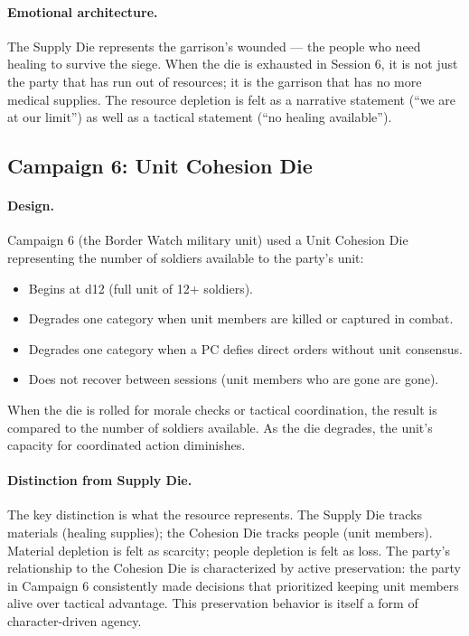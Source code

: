 \paragraph{Emotional architecture.}
The Supply Die represents the garrison's wounded --- the people who need healing to
survive the siege. When the die is exhausted in Session 6, it is not just the party
that has run out of resources; it is the garrison that has no more medical supplies.
The resource depletion is felt as a narrative statement (``we are at our limit'') as
well as a tactical statement (``no healing available'').

\subsection{Campaign 6: Unit Cohesion Die}

\paragraph{Design.}
Campaign 6 (the Border Watch military unit) used a Unit Cohesion Die representing the
number of soldiers available to the party's unit:

\begin{itemize}
  \item Begins at d12 (full unit of 12+ soldiers).
  \item Degrades one category when unit members are killed or captured in combat.
  \item Degrades one category when a PC defies direct orders without unit consensus.
  \item Does not recover between sessions (unit members who are gone are gone).
\end{itemize}

When the die is rolled for morale checks or tactical coordination, the result is
compared to the number of soldiers available. As the die degrades, the unit's capacity
for coordinated action diminishes.

\paragraph{Distinction from Supply Die.}
The key distinction is what the resource represents. The Supply Die tracks materials
(healing supplies); the Cohesion Die tracks people (unit members). Material depletion
is felt as scarcity; people depletion is felt as loss. The party's relationship to
the Cohesion Die is characterized by active preservation: the party in Campaign 6
consistently made decisions that prioritized keeping unit members alive over tactical
advantage. This preservation behavior is itself a form of character-driven agency.

